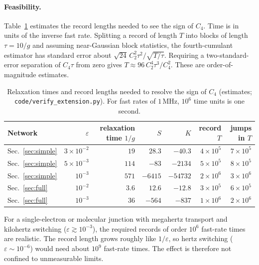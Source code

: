 \documentclass[11pt,a4paper]{article}
\theoremstyle{remark}\newtheorem{remark}[theorem]{Remark}
\newcommand{\eps}{\varepsilon}
\begin{document}
\paragraph{Feasibility.} Table~\ref{tab:feas} estimates the record lengths needed to see the sign of $C_4$. Time is in units of the inverse fast rate. Splitting a record of length $T$ into blocks of length $\tau=10/g$ and assuming near-Gaussian block statistics, the fourth-cumulant estimator has standard error about $\sqrt{24}\,C_2^2\tau^2/\sqrt{T/\tau}$. Requiring a two-standard-error separation of $C_4\tau$ from zero gives $T\approx96\,C_2^4\tau^3/C_4^2$. These are order-of-magnitude estimates.
\begin{table}[tb]\centering\small
\begin{tabular}{lrrrrrr}
\toprule
Network & $\eps$ & relaxation time $1/g$ & $S$ & $K$ & record $T$ & jumps in $T$\\
\midrule
Sec.~\ref{sec:simple} & $3\times10^{-2}$ & $19$ & $28.3$ & $-40.3$ & $4\times10^5$ & $7\times10^5$\\
Sec.~\ref{sec:simple} & $5\times10^{-3}$ & $114$ & $-83$ & $-2134$ & $5\times10^5$ & $8\times10^5$\\
Sec.~\ref{sec:simple} & $10^{-3}$ & $571$ & $-6415$ & $-54732$ & $2\times10^6$ & $3\times10^6$\\
Sec.~\ref{sec:full} & $10^{-2}$ & $3.6$ & $12.6$ & $-12.8$ & $3\times10^5$ & $6\times10^5$\\
Sec.~\ref{sec:full} & $10^{-3}$ & $36$ & $-564$ & $-837$ & $1\times10^6$ & $2\times10^6$\\
\bottomrule
\end{tabular}
\caption{Relaxation times and record lengths needed to resolve the sign of $C_4$ (estimates; \texttt{code/verify\_extension.py}). For fast rates of $1\,$MHz, $10^6$ time units is one second.}\label{tab:feas}
\end{table}
For a single-electron or molecular junction with megahertz transport and kilohertz switching ($\eps\gtrsim10^{-3}$), the required records of order $10^6$ fast-rate times are realistic. The record length grows roughly like $1/\eps$, so hertz switching ($\eps\sim10^{-6}$) would need about $10^9$ fast-rate times. The effect is therefore not confined to unmeasurable limits.
\end{document}
